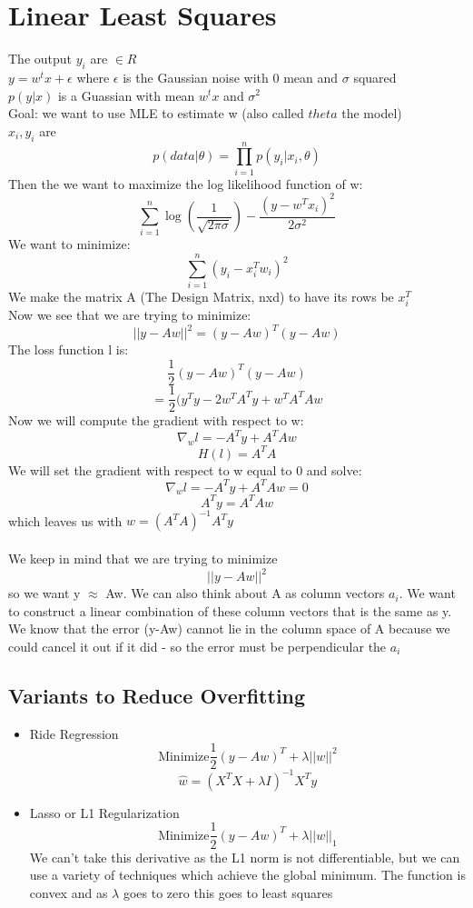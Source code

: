 \documentclass{article}
\begin{document}
\section{Linear Least Squares}
The output $y_i$ are $\in R$\\
$y = w^tx + \epsilon$ where $\epsilon$ is the Gaussian noise with 0 mean and $\sigma$ squared \\
$p(y|x)$ is a Guassian with mean $w^tx$ and $\sigma^2$ \\
Goal: we want to use MLE to estimate w (also called $theta$ the model)\\
$x_i, y_i$ are
$$p(data|\theta) = \prod_{i=1}^n p(y_i|x_i,\theta)$$
Then the we want to maximize the log likelihood function of w:
$$\sum_{i=1}^n \log(\frac{1}{\sqrt{2\pi \sigma}}) - \frac{(y - w^Tx_i)^2}{2 \sigma^2}$$
We want to minimize:
$$\sum_{i=1}^n (y_i - x_i^Tw_i)^2$$
We make the matrix A (The Design Matrix, nxd)  to have its rows be $x_i^T$ \\
Now we see that we are trying to minimize:
$$||y-Aw||^2 = (y-Aw)^T(y-Aw)$$
The loss function l is:
$$\frac{1}{2} (y-Aw)^T(y-Aw)$$
$$= \frac{1}{2} (y^Ty - 2w^TA^Ty + w^TA^TAw$$
Now we will compute the gradient with respect to w:
$$\nabla_w l = -A^Ty + A^TAw$$
$$H(l) = A^TA$$
We will set the gradient with respect to w equal to 0 and solve:
$$\nabla_w l = -A^Ty + A^TAw = 0$$
$$A^Ty = A^TAw$$ which leaves us with $w = (A^TA)^{-1}A^Ty$ \\ \\
We keep in mind that we are trying to minimize $$||y-Aw||^2$$ so we want y $\approx$ Aw. We can also think about A as column vectors $a_i$. We want to construct a linear combination of these column vectors that is the same as y. We know that the error (y-Aw) cannot lie in the column space of A because we could cancel it out if it did - so the error must be perpendicular the $a_i$ 
\subsection{Variants to Reduce Overfitting}
\begin{itemize}
\item Ride Regression
$$\textrm{Minimize} \frac{1}{2} (y-Aw)^T + \lambda ||w||^2$$
$$\hat{w} = (X^TX + \lambda I)^{-1} X^Ty$$
\item Lasso or L1 Regularization
$$\textrm{Minimize} \frac{1}{2} (y-Aw)^T + \lambda ||w||_1$$
We can't take this derivative as the L1 norm is not differentiable, but we can use a variety of techniques which achieve the global minimum. The function is convex and as $\lambda$ goes to zero this goes to least squares
\end{itemize}
\end{document}
